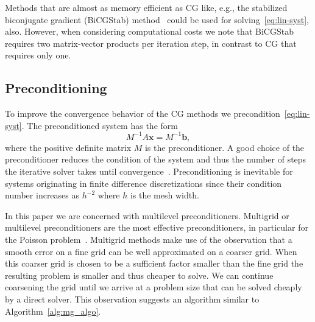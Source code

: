 \documentclass[a4paper,10pt,3p,preprint,pdftex]{elsarticle}
\begin{document}
Methods that are almost as memory efficient as CG like, e.g., the
stabilized biconjugate gradient (BiCGStab) method~\cite{vors:92} could
be used for solving~\eqref{eq:lin-syst}, also.  However, when
considering computational costs we note that BiCGStab requires two
matrix-vector products per iteration step, in contrast to CG that
requires only one.

\subsection{Preconditioning}

To improve the convergence behavior of the CG methods we
precondition~\eqref{eq:lin-syst}.  The preconditioned system has the
form
\begin{equation*}
  {M}^{-1}{A} \mathbf{x} = {M}^{-1}\mathbf{b},
\end{equation*}
where the positive definite matrix $M$ is the preconditioner.
A good choice of the preconditioner reduces the condition of the system
and thus the number of steps the iterative solver takes until
convergence~\cite{hack:94,gree:97}.  Preconditioning is inevitable for
systems originating in finite difference discretizations since their
condition number increases as $h^{-2}$ where $h$ is the mesh width.

In this paper we are concerned with multilevel preconditioners.
Multigrid or multilevel preconditioners are the most effective
preconditioners, in particular for the Poisson
problem~\cite{hack:85,tros:00}.  Multigrid methods make use of the
observation that a smooth error on a fine grid can be well approximated
on a coarser grid.  When this coarser grid is chosen to be a sufficient
factor smaller than the fine grid the resulting problem is smaller and
thus cheaper to solve.  We can continue coarsening the grid until we
arrive at a problem size that can be solved cheaply by a direct solver.
This observation suggests an algorithm similar to
Algorithm~\ref{alg:mg_algo}.
\end{document}
